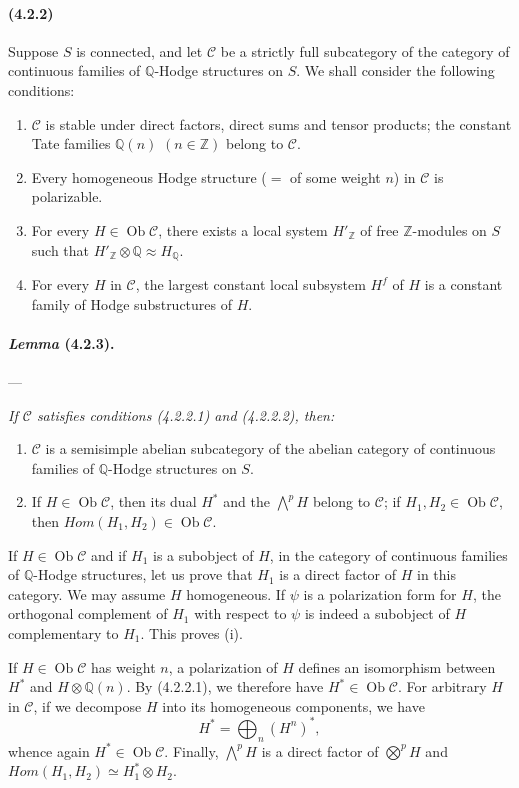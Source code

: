 \documentclass[10pt]{article}
\newcommand{\Q}{\mathbb Q}
\newcommand{\Z}{\mathbb Z}
\newcommand{\Ob}{\operatorname{Ob}}
\begin{document}
\paragraph{(4.2.2)} Suppose $S$ is connected, and let $\mathcal C$ be a strictly full subcategory of the category of continuous families of $\Q$-Hodge structures on $S$. We shall consider the following conditions:
\begin{enumerate}[label=(4.2.2.\arabic*)]
\item $\mathcal C$ is stable under direct factors, direct sums and tensor products; the constant Tate families $\Q(n)$ $(n\in\Z)$ belong to $\mathcal C$.
\item Every homogeneous Hodge structure ($={}$ of some weight $n$) in $\mathcal C$ is polarizable.
\item For every $H\in\Ob\mathcal C$, there exists a local system $H'_\Z$ of free $\Z$-modules on $S$ such that $H'_\Z\otimes\Q\approx H_\Q$.
\item For every $H$ in $\mathcal C$, the largest constant local subsystem $H^f$ of $H$ is a constant family of Hodge substructures of $H$.
\end{enumerate}

\paragraph{\emph{Lemma} (4.2.3).} --- {\itshape If $\mathcal C$ satisfies conditions (4.2.2.1) and (4.2.2.2), then:
\begin{enumerate}[label=(\roman*)]
\item $\mathcal C$ is a semisimple abelian subcategory of the abelian category of continuous families of $\Q$-Hodge structures on $S$.
\item If $H\in\Ob\mathcal C$, then its dual $H^*$ and the $\bigwedge^pH$ belong to $\mathcal C$; if $H_1,H_2\in\Ob\mathcal C$, then $\mathit{Hom}(H_1,H_2)\in\Ob\mathcal C$.
\end{enumerate}}

If $H\in\Ob\mathcal C$ and if $H_1$ is a subobject of $H$, in the category of continuous families of $\Q$-Hodge structures, let us prove that $H_1$ is a direct factor of $H$ in this category. We may assume $H$ homogeneous. If $\psi$ is a polarization form for $H$, the orthogonal complement of $H_1$ with respect to $\psi$ is indeed a subobject of $H$ complementary to $H_1$. This proves (i).

If $H\in\Ob\mathcal C$ has weight $n$, a polarization of $H$ defines an isomorphism between $H^*$ and $H\otimes\Q(n)$. By (4.2.2.1), we therefore have $H^*\in\Ob\mathcal C$. For arbitrary $H$ in $\mathcal C$, if we decompose $H$ into its homogeneous components, we have
\[
H^*=\bigoplus_n (H^n)^*,
\]
whence again $H^*\in\Ob\mathcal C$. Finally, $\bigwedge^pH$ is a direct factor of $\bigotimes^pH$ and $\mathit{Hom}(H_1,H_2)\simeq H_1^*\otimes H_2$.
\end{document}
